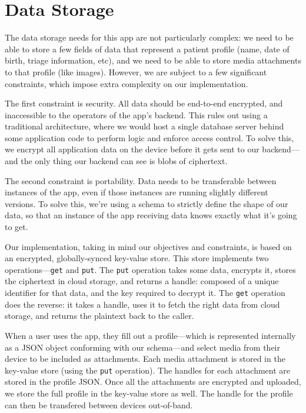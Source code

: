 \documentclass[11pt,letterpaper]{article}
\begin{document}
\section{Data Storage}

The data storage needs for this app are not particularly complex: we need to be able to store a few fields of data that represent a patient profile (name, date of birth, triage information, etc), and we need to be able to store media attachments to that profile (like images). However, we are subject to a few significant constraints, which impose extra complexity on our implementation.

The first constraint is security. All data should be end-to-end encrypted, and inaccessible to the operators of the app's backend. This rules out using a traditional architecture, where we would host a single database server behind some application code to perform logic and enforce access control. To solve this, we encrypt all application data on the device before it gets sent to our backend---and the only thing our backend can see is blobs of ciphertext.

The second constraint is portability. Data needs to be transferable between instances of the app, even if those instances are running slightly different versions. To solve this, we're using a schema to strictly define the shape of our data, so that an instance of the app receiving data knows exactly what it's going to get.

Our implementation, taking in mind our objectives and constraints, is based on an encrypted, globally-synced key-value store. This store implements two operations---\verb|get| and \verb|put|. The \verb|put| operation takes some data, encrypts it, stores the ciphertext in cloud storage, and returns a handle: composed of a unique identifier for that data, and the key required to decrypt it. The \verb|get| operation does the reverse: it takes a handle, uses it to fetch the right data from cloud storage, and returns the plaintext back to the caller.

When a user uses the app, they fill out a profile---which is represented internally as a JSON object conforming with our schema---and select media from their device to be included as attachments. Each media attachment is stored in the key-value store (using the \verb|put| operation). The handles for each attachment are stored in the profile JSON. Once all the attachments are encrypted and uploaded, we store the full profile in the key-value store as well. The handle for the profile can then be transfered between devices out-of-band. 
\end{document}

